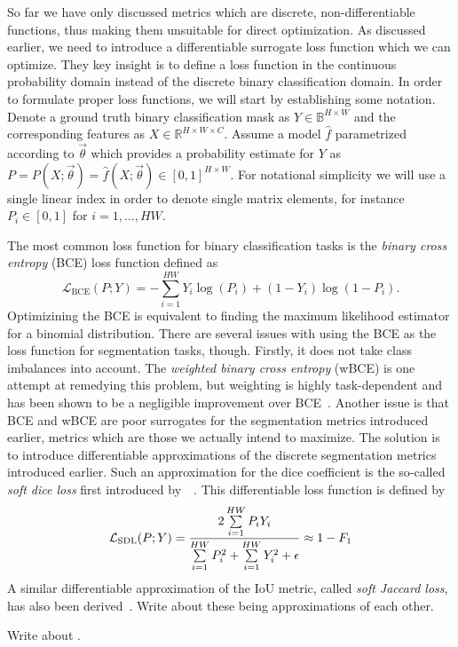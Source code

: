 So far we have only discussed metrics which are discrete, non-differentiable functions, thus making them unsuitable for direct optimization.
As discussed earlier, we need to introduce a differentiable surrogate loss function which we can optimize.
They key insight is to define a loss function in the continuous probability domain instead of the discrete binary classification domain.
In order to formulate proper loss functions, we will start by establishing some notation.
Denote a ground truth binary classification mask as $Y \in \mathbb{B}^{H \times W}$ and the corresponding features as $X \in \mathbb{R}^{H \times W \times C}$.
Assume a model $\hat{f}$ parametrized according to $\vec{\theta}$ which provides a probability estimate for $Y$ as $P = P(X; \vec{\theta}) = \hat{f}(X; \vec{\theta}) \in [0, 1]^{H \times W}$.
For notational simplicity we will use a single linear index in order to denote single matrix elements, for instance $P_i \in [0, 1]$ for $i = 1, \ldots, HW$.

The most common loss function for binary classification tasks is the \textit{binary cross entropy} (BCE) loss function defined as
%
\begin{equation*}
  \mathcal{L}_{\mathrm{BCE}}(P; Y)
  =
  - \sum\limits_{i = 1}^{HW}
  Y_i \log{(P_i)}
  +
  (1 - Y_i) \log{(1 - P_i)}.
\end{equation*}
%
Optimizining the BCE is equivalent to finding the maximum likelihood estimator for a binomial distribution.
There are several issues with using the BCE as the loss function for segmentation tasks, though.
Firstly, it does not take class imbalances into account.
The \textit{weighted binary cross entropy} (wBCE) is one attempt at remedying this problem, but weighting is highly task-dependent and has been shown to be a negligible improvement over BCE~\cite[p.~98]{soft-losses}.
Another issue is that BCE and wBCE are poor surrogates for the segmentation metrics introduced earlier, metrics which are those we actually intend to maximize.
The solution is to introduce differentiable approximations of the discrete segmentation metrics introduced earlier.
Such an approximation for the dice coefficient is the so-called \textit{soft dice loss} first introduced by~\citeauthor{original-soft-dice-loss}~\cite{original-soft-dice-loss}.
This differentiable loss function is defined by
%
\begin{equation*}
  \mathcal{L}_{\mathrm{SDL}}(P; Y)
  =
  \frac{%
    2 \sum\limits_{i = 1}^{HW}
    P_i Y_i
  }{%
    \sum\limits_{i = 1}^{HW} P_i^2
    +
    \sum\limits_{i = 1}^{HW}  Y_i^2
    +
    \epsilon
  }
  \approx
  1 - F_1
\end{equation*}
%
A similar differentiable approximation of the IoU metric, called \textit{soft Jaccard loss}, has also been derived~\cite{soft-jacard-loss}.
Write about these being approximations of each other.

Write about \cite{soft-losses,generalized-dice-overlap}.
